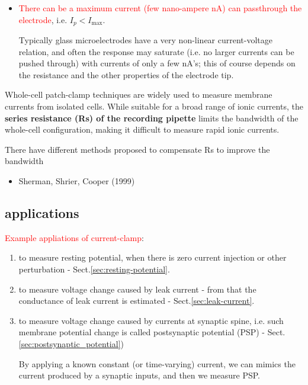 \begin{itemize}
   \item \textcolor{red}{There can be a maximum current (few nano-ampere nA) can
   passthrough the electrode}, i.e. $I_p < I_\max$.

Typically glass microelectrodes have a very non-linear current-voltage relation,
and often the response may saturate (i.e. no larger currents can be pushed
through) with currents of only a few nA's; this of course depends on the
resistance and the other properties of the electrode tip.

\end{itemize}


Whole-cell patch-clamp techniques are widely used to measure membrane currents
from isolated cells. While suitable for a broad range of ionic currents, the
{\bf series resistance (Rs) of the recording pipette} limits the bandwidth of
the whole-cell configuration, making it difficult to measure rapid ionic currents.

There have different methods proposed to compensate Rs to improve the bandwidth
\begin{itemize}
  \item Sherman, Shrier, Cooper (1999)
\end{itemize}


\subsection{applications}
\label{sec:voltage-recording}

\textcolor{red}{Example appliations of current-clamp}:
\begin{enumerate}

  \item to measure resting potential, when there is zero current injection or
  other perturbation - Sect.\ref{sec:resting-potential}.

  \item to measure voltage change caused by leak current - from that the
  conductance of leak current is estimated - Sect.\ref{sec:leak-current}.

  \item  to measure voltage change caused by currents at synaptic spine,
  i.e. such membrane potential change is called postsynaptic potential (PSP) -
  Sect.\ref{sec:postsynaptic_potential})

  By applying a known constant (or time-varying) current, we can mimics the
  current produced by a synaptic inputs, and then we measure PSP.


\end{enumerate}

